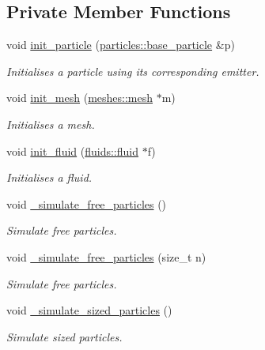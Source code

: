 \subsection*{Private Member Functions}
\begin{DoxyCompactItemize}
\item 
void \hyperlink{classphysim_1_1simulator_a55759abc6a93f89e3244bc16518c7fe4}{init\+\_\+particle} (\hyperlink{classphysim_1_1particles_1_1base__particle}{particles\+::base\+\_\+particle} \&p)
\begin{DoxyCompactList}\small\item\em Initialises a particle using its corresponding emitter. \end{DoxyCompactList}\item 
void \hyperlink{classphysim_1_1simulator_a5344fb7665e2f4c0e7930f7897f9a3bf}{init\+\_\+mesh} (\hyperlink{classphysim_1_1meshes_1_1mesh}{meshes\+::mesh} $\ast$m)
\begin{DoxyCompactList}\small\item\em Initialises a mesh. \end{DoxyCompactList}\item 
void \hyperlink{classphysim_1_1simulator_afc4f4dc27c302b5dd31824429d67104c}{init\+\_\+fluid} (\hyperlink{classphysim_1_1fluids_1_1fluid}{fluids\+::fluid} $\ast$f)
\begin{DoxyCompactList}\small\item\em Initialises a fluid. \end{DoxyCompactList}\item 
void \hyperlink{classphysim_1_1simulator_ae553797df3ee38cfe3c93bbc0b94be06}{\+\_\+simulate\+\_\+free\+\_\+particles} ()
\begin{DoxyCompactList}\small\item\em Simulate free particles. \end{DoxyCompactList}\item 
void \hyperlink{classphysim_1_1simulator_acf1b77beeaf600d40f88d7b91dac80f7}{\+\_\+simulate\+\_\+free\+\_\+particles} (size\+\_\+t n)
\begin{DoxyCompactList}\small\item\em Simulate free particles. \end{DoxyCompactList}\item 
void \hyperlink{classphysim_1_1simulator_a04922992cda3b1c402da7041324c6049}{\+\_\+simulate\+\_\+sized\+\_\+particles} ()
\begin{DoxyCompactList}\small\item\em Simulate sized particles. \end{DoxyCompactList}\item 

\end{DoxyCompactItemize}
